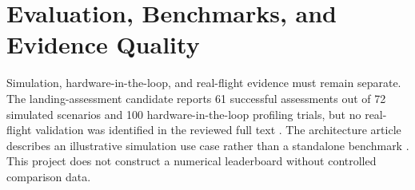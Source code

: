\section{Evaluation, Benchmarks, and Evidence Quality}

Simulation, hardware-in-the-loop, and real-flight evidence must remain
separate. The landing-assessment candidate reports 61 successful assessments
out of 72 simulated scenarios and 100 hardware-in-the-loop profiling trials,
but no real-flight validation was identified in the reviewed full text
\cite{p_2607_02277}. The architecture article describes an illustrative
simulation use case rather than a standalone benchmark \cite{p_2609_19961}.
This project does not construct a numerical leaderboard without controlled
comparison data.
